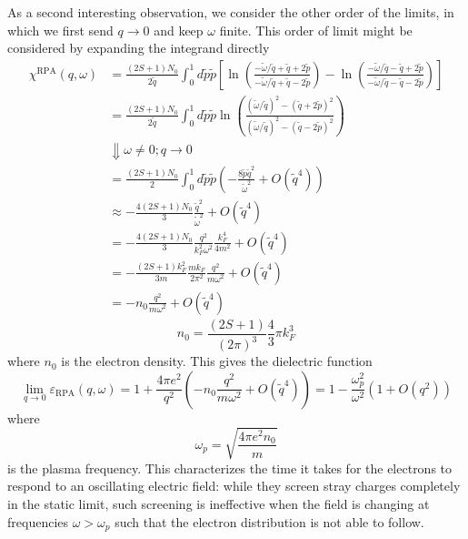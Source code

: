 As a second interesting observation, we consider the other order of the limits, in which we first send $q\to 0$ and keep $\omega$ finite. This order of limit might be considered by expanding the integrand directly
\begin{align*}
    \chi ^{\mathrm{RPA}}\left( q,\omega \right) &=\frac{\left( 2S+1 \right) N_0}{2\tilde{q}}\int_0^1{d\tilde{p}\tilde{p}\left[ \ln \left( \frac{-\tilde{\omega}/\tilde{q}+\tilde{q}+2\tilde{p}}{-\tilde{\omega}/\tilde{q}+\tilde{q}-2\tilde{p}} \right) -\ln \left( \frac{-\tilde{\omega}/\tilde{q}-\tilde{q}+2\tilde{p}}{-\tilde{\omega}/\tilde{q}-\tilde{q}-2\tilde{p}} \right) \right]}\\
    &=\frac{\left( 2S+1 \right) N_0}{2\tilde{q}}\int_0^1{d\tilde{p}\tilde{p}\ln \left( \frac{\left( \tilde{\omega}/\tilde{q} \right) ^2-\left( \tilde{q}+2\tilde{p} \right) ^2}{\left( \tilde{\omega}/\tilde{q} \right) ^2-\left( \tilde{q}-2\tilde{p} \right) ^2} \right)}\\
    &\Downarrow \omega \ne 0;q\rightarrow 0\\
    &=\frac{\left( 2S+1 \right) N_0}{2}\int_0^1{d\tilde{p}\tilde{p}\left( -\frac{8\tilde{p}\tilde{q}^2}{\tilde{\omega}^2}+O\left( \tilde{q}^4 \right) \right)}\\
    &\approx -\frac{4\left( 2S+1 \right) N_0}{3}\frac{\tilde{q}^2}{\tilde{\omega}^2}+O\left( \tilde{q}^4 \right) \\
    &=-\frac{4\left( 2S+1 \right) N_0}{3}\frac{q^2}{k_{F}^{2}\omega ^2}\frac{k_{F}^{4}}{4m^2}+O\left( \tilde{q}^4 \right) \\
    &=-\frac{\left( 2S+1 \right) k_{F}^{2}}{3m}\frac{mk_F}{2\pi ^2}\frac{q^2}{m\omega ^2}+O\left( \tilde{q}^4 \right) \\
    &=-n_0\frac{q^2}{m\omega ^2}+O\left( \tilde{q}^4 \right)
\end{align*}
\[ n_0=\frac{\left( 2S+1 \right)}{\left( 2\pi \right) ^3}\frac{4}{3}\pi k_{F}^{3}\]
where $n_0$ is the electron density. This gives the dielectric function
\[ \lim_{q\rightarrow 0} \varepsilon _{\mathrm{RPA}}\left( q,\omega \right) =1+\frac{4\pi e^2}{q^2}\left( -n_0\frac{q^2}{m\omega ^2}+O\left( \tilde{q}^4 \right) \right) =1-\frac{\omega _{p}^{2}}{\omega ^2}\left( 1+O\left( q^2 \right) \right) \]
where
\[ \omega _p=\sqrt{\frac{4\pi e^2n_0}{m}}\]
is the plasma frequency. This characterizes the time it takes for the electrons to respond to an oscillating electric field: while they screen stray charges completely in the static limit, such screening is ineffective when the field is changing at frequencies $\omega > \omega_p$ such that the electron distribution is not able to follow.

